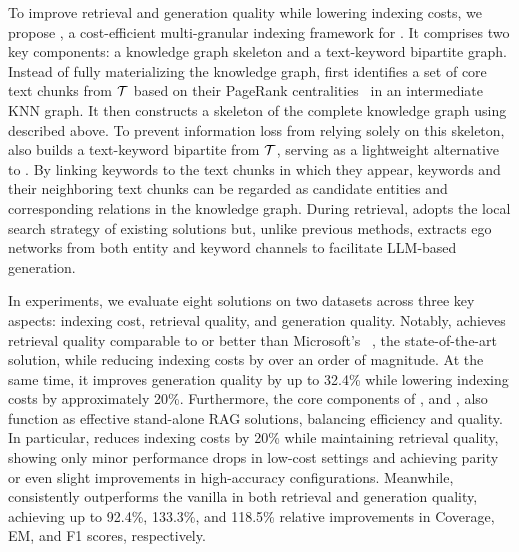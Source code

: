 To improve retrieval and generation quality while lowering indexing costs, we propose \sketrag, a cost-efficient multi-granular indexing framework for \graphrag. It comprises two key components: a knowledge graph skeleton and a text-keyword bipartite graph.
Instead of fully materializing the knowledge graph, \sketrag first identifies a set of core text chunks from $\mathcal{T}$ based on their PageRank centralities~\cite{page1999pagerank} in an intermediate KNN graph. It then constructs a skeleton of the complete knowledge graph using \kgrag described above. To prevent information loss from relying solely on this skeleton, \sketrag also builds a text-keyword bipartite from $\mathcal{T}$, serving as a lightweight alternative to \kgrag. By linking keywords to the text chunks in which they appear, keywords and their neighboring text chunks can be regarded as candidate entities and corresponding relations in the knowledge graph. During retrieval, \sketrag adopts the local search strategy of existing solutions but, unlike previous methods, extracts ego networks from both entity and keyword channels to facilitate LLM-based generation.

In experiments, we evaluate eight solutions on two datasets across three key aspects: indexing cost, retrieval quality, and generation quality. Notably, \sketrag achieves retrieval quality comparable to or better than Microsoft's \graphrag~\cite{edge2024local}, the state-of-the-art \kgrag solution, while reducing indexing costs by over an order of magnitude. At the same time, it improves generation quality by up to 32.4\% while lowering indexing costs by approximately 20\%.
Furthermore, the core components of \sketrag, \skeletonrag and \keyrag, also function as effective stand-alone RAG solutions, balancing efficiency and quality. In particular, \skeletonrag reduces indexing costs by 20\% while maintaining retrieval quality, showing only minor performance drops in low-cost settings and achieving parity or even slight improvements in high-accuracy configurations. Meanwhile, \keyrag consistently outperforms the vanilla \textrag in both retrieval and generation quality, achieving up to 92.4\%, 133.3\%, and 118.5\% relative improvements in Coverage, EM, and F1 scores, respectively.

